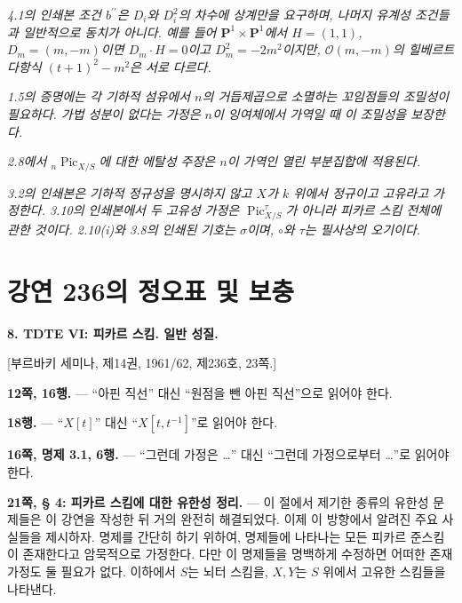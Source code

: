 \documentclass[11pt,twoside,openany]{book}
\numberwithin{equation}{section}
\newcommand{\sourceunit}{front}
\newcommand{\src}[1]{%
  \phantomsection\hypertarget{src:\sourceunit:#1}{}%
  \marginpar{\raggedleft\footnotesize\sffamily #1}%
}
\theoremstyle{plain}
\theoremstyle{definition}
\theoremstyle{remark}
\begin{document}
\par\smallskip
\begingroup\footnotesize





\noindent\textit{4.1의 인쇄본 조건 $b^{\prime\prime}$은 $D_i$와 $D_i^2$의 차수에 상계만을 요구하며, 나머지 유계성 조건들과 일반적으로 동치가 아니다. 예를 들어 $\mathbf P^1\times\mathbf P^1$에서 $H=(1,1)$, $D_m=(m,-m)$이면 $D_m\cdot H=0$이고 $D_m^2=-2m^2$이지만, $\mathcal O(m,-m)$의 힐베르트 다항식 $(t+1)^2-m^2$은 서로 다르다.}\par
\noindent\textit{1.5의 증명에는 각 기하적 섬유에서 $n$의 거듭제곱으로 소멸하는 꼬임점들의 조밀성이 필요하다. 가법 성분이 없다는 가정은 $n$이 잉여체에서 가역일 때 이 조밀성을 보장한다.}\par
\noindent\textit{2.8에서 ${}_n\operatorname{Pic}_{X/S}$에 대한 에탈성 주장은 $n$이 가역인 열린 부분집합에 적용된다.}\par
\noindent\textit{3.2의 인쇄본은 기하적 정규성을 명시하지 않고 $X$가 $k$ 위에서 정규이고 고유라고 가정한다. 3.10의 인쇄본에서 두 고유성 가정은 $\operatorname{Pic}_{X/S}^{\tau}$가 아니라 피카르 스킴 전체에 관한 것이다. 2.10(i)와 3.8의 인쇄된 기호는 $\sigma$이며, $\circ$와 $\tau$는 필사상의 오기이다.}\par
\endgroup

\par
\renewcommand{\sourceunit}{e236}
\clearpage
\chapter*{강연 236의 정오표 및 보충}
\src{303}

\noindent\textbf{8. TDTE VI: 피카르 스킴. 일반 성질.}

\begin{center}
[부르바키 세미나, 제14권, 1961/62, 제236호, 23쪽.]
\end{center}

\noindent\textbf{12쪽, 16행.} --- ``아핀 직선'' 대신
``원점을 뺀 아핀 직선''으로 읽어야 한다.

\noindent\textbf{18행.} --- ``$X[t]$'' 대신
``$X[t,t^{-1}]$''로 읽어야 한다.

\noindent\textbf{16쪽, 명제 3.1, 6행.} --- ``그런데 가정은 …'' 대신
``그런데 가정으로부터 …''로 읽어야 한다.

\noindent\textbf{21쪽, § 4: 피카르 스킴에 대한 유한성 정리.} ---
이 절에서 제기한 종류의 유한성 문제들은 이 강연을 작성한 뒤 거의 완전히
해결되었다. 이제 이 방향에서 알려진 주요 사실들을 제시하자. 명제를
간단히 하기 위하여, 명제들에 나타나는 모든 피카르 준스킴이 존재한다고
암묵적으로 가정한다. 다만 이 명제들을 명백하게 수정하면 어떠한 존재
가정도 둘 필요가 없다. 이하에서 $S$는 뇌터 스킴을, $X,Y$는 $S$ 위에서
고유한 스킴들을 나타낸다.
\end{document}
